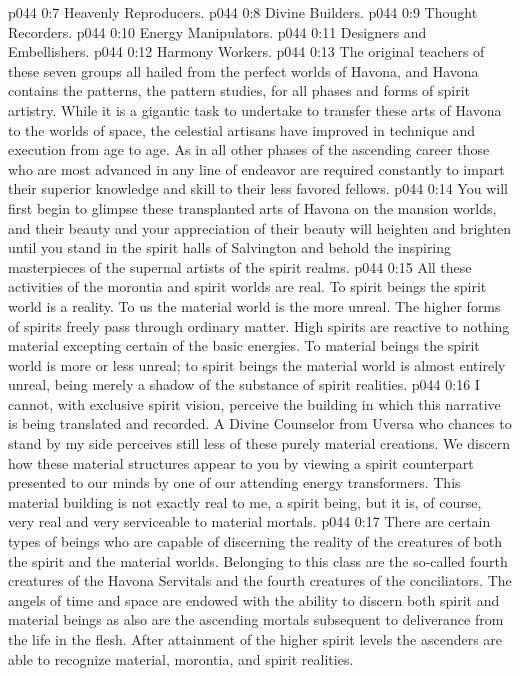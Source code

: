 \vs p044 0:7 \bibnobreakspace Heavenly Reproducers.
\vs p044 0:8 \bibnobreakspace Divine Builders.
\vs p044 0:9 \bibnobreakspace Thought Recorders.
\vs p044 0:10 \bibnobreakspace Energy Manipulators.
\vs p044 0:11 \bibnobreakspace Designers and Embellishers.
\vs p044 0:12 \bibnobreakspace Harmony Workers.
\pc \vs p044 0:13 The original teachers of these seven groups all hailed from the perfect worlds of Havona, and Havona contains the patterns, the pattern studies, for all phases and forms of spirit artistry. While it is a gigantic task to undertake to transfer these arts of Havona to the worlds of space, the celestial artisans have improved in technique and execution from age to age. As in all other phases of the ascending career those who are most advanced in any line of endeavor are required constantly to impart their superior knowledge and skill to their less favored fellows.
\vs p044 0:14 You will first begin to glimpse these transplanted arts of Havona on the mansion worlds, and their beauty and your appreciation of their beauty will heighten and brighten until you stand in the spirit halls of Salvington and behold the inspiring masterpieces of the supernal artists of the spirit realms.
\pc \vs p044 0:15 All these activities of the morontia and spirit worlds are real. To spirit beings the spirit world is a reality. To us the material world is the more unreal. The higher forms of spirits freely pass through ordinary matter. High spirits are reactive to nothing material excepting certain of the basic energies. To material beings the spirit world is more or less unreal; to spirit beings the material world is almost entirely unreal, being merely a shadow of the substance of spirit realities.
\vs p044 0:16 I cannot, with exclusive spirit vision, perceive the building in which this narrative is being translated and recorded. A Divine Counselor from Uversa who chances to stand by my side perceives still less of these purely material creations. We discern how these material structures appear to you by viewing a spirit counterpart presented to our minds by one of our attending energy transformers. This material building is not exactly real to me, a spirit being, but it is, of course, very real and very serviceable to material mortals.
\vs p044 0:17 There are certain types of beings who are capable of discerning the reality of the creatures of both the spirit and the material worlds. Belonging to this class are the so\hyp{}called fourth creatures of the Havona Servitals and the fourth creatures of the conciliators. The angels of time and space are endowed with the ability to discern both spirit and material beings as also are the ascending mortals subsequent to deliverance from the life in the flesh. After attainment of the higher spirit levels the ascenders are able to recognize material, morontia, and spirit realities.
